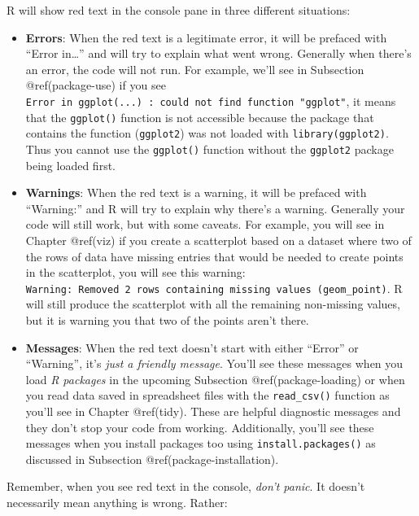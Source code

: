 \documentclass[
]{article}
\providecommand{\tightlist}{%
  \setlength{\itemsep}{0pt}\setlength{\parskip}{0pt}}
\begin{document}
R will show red text in the console pane in three different situations:

\begin{itemize}
\tightlist
\item
  \textbf{Errors}:  When the red text is a legitimate
  error, it will be prefaced with ``Error in\ldots{}'' and will try to
  explain what went wrong. Generally when there's an error, the code
  will not run. For example, we'll see in Subsection @ref(package-use)
  if you see
  \texttt{Error\ in\ ggplot(...)\ :\ could\ not\ find\ function\ "ggplot"},
  it means that the \texttt{ggplot()} function is not accessible because
  the package that contains the function (\texttt{ggplot2}) was not
  loaded with \texttt{library(ggplot2)}. Thus you cannot use the
  \texttt{ggplot()} function without the \texttt{ggplot2} package being
  loaded first.
\item
  \textbf{Warnings}:  When the red text is a warning,
  it will be prefaced with ``Warning:'' and R will try to explain why
  there's a warning. Generally your code will still work, but with some
  caveats. For example, you will see in Chapter @ref(viz) if you create
  a scatterplot based on a dataset where two of the rows of data have
  missing entries that would be needed to create points in the
  scatterplot, you will see this warning:
  \texttt{Warning:\ Removed\ 2\ rows\ containing\ missing\ values\ (geom\_point)}.
  R will still produce the scatterplot with all the remaining
  non-missing values, but it is warning you that two of the points
  aren't there.
\item
  \textbf{Messages}:  When the red text doesn't start
  with either ``Error'' or ``Warning'', it's \emph{just a friendly
  message}. You'll see these messages when you load \emph{R packages} in
  the upcoming Subsection @ref(package-loading) or when you read data
  saved in spreadsheet files with the \texttt{read\_csv()} function as
  you'll see in Chapter @ref(tidy). These are helpful diagnostic
  messages and they don't stop your code from working. Additionally,
  you'll see these messages when you install packages too using
  \texttt{install.packages()} as discussed in Subsection
  @ref(package-installation).
\end{itemize}

Remember, when you see red text in the console, \emph{don't panic}. It
doesn't necessarily mean anything is wrong. Rather:
\end{document}
